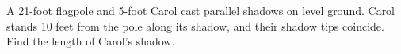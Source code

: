 A 21-foot flagpole and 5-foot Carol cast parallel shadows on level ground. Carol stands 10 feet from the pole along its shadow, and their shadow tips coincide. Find the length of Carol's shadow.
